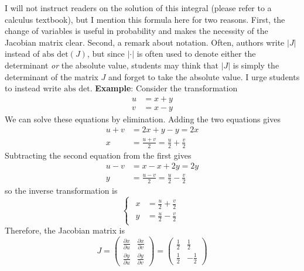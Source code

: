 I will not instruct readers on the solution of this integral (please refer to a calculus textbook), 
but I mention this formula here for two reasons. First, the change of variables is useful in 
probability and makes the necessity of the Jacobian matrix clear. 
Second, a remark about notation. Often, authors write $|J|$ instead of $\text{abs det}(J)$, 
but since $|\cdot|$ is often used to 
denote either the determinant \textit{or} the absolute value, students may think that 
$|J|$ is simply the determinant of the matrix $J$ and forget to take the absolute value. 
I urge students 
to instead write $\text{abs det}$.
\textbf{Example}: Consider the transformation
 \begin{equation*}
    \begin{aligned}
        u &= x + y \\ 
        v &= x - y
    \end{aligned}
\end{equation*}
We can solve these equations by elimination. Adding the two equations gives
 \begin{equation*}
    \begin{aligned}
        u + v &= 2x + y - y = 2x \\ 
        x & = \frac{u + v}{2} = \frac{u}{2} + \frac{v}{2}
    \end{aligned}
\end{equation*}
Subtracting the second equation from the first gives
 \begin{equation*}
    \begin{aligned}
        u - v &= x - x + 2y = 2y \\ 
        y & = \frac{u - v}{2} = \frac{u}{2} - \frac{v}{2}
    \end{aligned}
\end{equation*}
so the inverse transformation is 
 \begin{equation*}
    \begin{cases}
        \begin{aligned}
            x & = \frac{u}{2} + \frac{v}{2} \\ 
            y & = \frac{u}{2} - \frac{v}{2}
        \end{aligned}
    \end{cases}
\end{equation*}
Therefore, the Jacobian matrix is 
{
    \renewcommand{\arraystretch}{1.5}
    \setlength{\arraycolsep}{6pt}
    \begin{equation*}
        J = 
        \begin{pmatrix}
            \frac{\partial x}{\partial u} & \frac{\partial x}{\partial v} \\ 
            \frac{\partial y}{\partial u} & \frac{\partial y}{\partial v}
        \end{pmatrix} = 
        \begin{pmatrix}
            \frac{1}{2} & \frac{1}{2} \\ 
            \frac{1}{2} & - \frac{1}{2}
        \end{pmatrix}
    \end{equation*}
}
    
